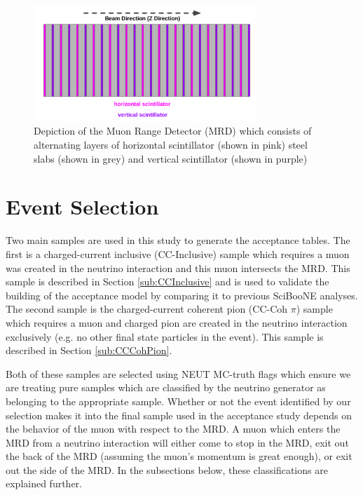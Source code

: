 \documentclass[11pt]{article}
\begin{document}
\begin{figure}[H]
\centering
\includegraphics[width=0.75\textwidth]{EventClassifications/mrd.png}
\caption{Depiction of the Muon Range Detector (MRD) which consists of alternating layers of horizontal scintillator (shown in pink) steel slabs (shown in grey) and vertical scintillator (shown in purple)}
\label{fig:mrddetector}
\end{figure}



\section{Event Selection}
\label{sec:eventselection}
Two main samples are used in this study to generate the acceptance tables. The first is a charged-current inclusive (CC-Inclusive) sample which requires a muon was created in the neutrino interaction and this muon intersects the MRD. This sample is described in Section \ref*{sub:CCInclusive} and is used to validate the building of the acceptance model by comparing it to previous SciBooNE analyses. The second sample is the charged-current coherent pion (CC-Coh $\pi$) sample which requires a muon and charged pion are created in the neutrino interaction exclusively (e.g. no other final state particles in the event). This sample is described in Section \ref*{sub:CCCohPion}.

Both of these samples are selected using NEUT MC-truth flags which ensure we are treating pure samples which are classified by the neutrino generator as belonging to the appropriate sample. Whether or not the event identified by our selection makes it into the final sample used in the acceptance study depends on the behavior of the muon with respect to the MRD. A muon which enters the MRD from a neutrino interaction will either come to stop in the MRD, exit out the back of the MRD (assuming the muon's momentum is great enough), or exit out the side of the MRD. In the subsections below, these classifications are explained further.
\end{document}
